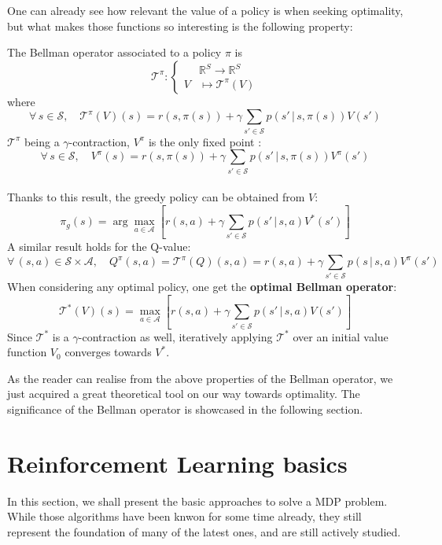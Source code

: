 One can already see how relevant the value of a policy is when seeking optimality, but what makes those functions so interesting is the following property:

\begin{defi}
  The Bellman operator \citep{bellman1957markovian} associated to a policy $\pi$ is $$\mathcal{T}^\pi : \begin{cases} &\mathbb{R}^S \to \mathbb{R}^S\\ V &\mapsto \mathcal{T}^\pi(V) \end{cases}$$ where $$\forall \, s \in \mathcal{S},\quad \mathcal{T}^\pi(V)(s) = r(s, \pi(s)) + \gamma \sum_{s'\in \mathcal{S}} p(s' \,|\, s, \pi(s)) V(s')$$
  $\mathcal{T}^\pi$ being a $\gamma$-contraction, $V^\pi$ is the only fixed point \citep{blackwell1962discrete}: $$\forall \, s \in \mathcal{S},\quad V^\pi(s) = r(s, \pi(s)) + \gamma \sum_{s'\in \mathcal{S}} p(s' \,|\, s, \pi(s)) V^\pi(s')$$\\
  Thanks to this result, the greedy policy can be obtained from $V$: $$\pi_g(s) = \arg\max_{a \in \mathcal{A}} \left[ r(s,a) + \gamma \sum_{s' \in \mathcal{S}}p(s' \,|\, s, a) V^*(s') \right]$$
  A similar result holds for the Q-value: $$\forall \, (s, a) \in \mathcal{S}\times \mathcal{A},\quad Q^\pi(s, a) = \mathcal{T}^\pi(Q)(s,a) = r(s, a) + \gamma \sum_{s' \in \mathcal{S}} p(s \,|\, s,a) V^\pi (s')$$
  When considering any optimal policy, one get the \textbf{optimal Bellman operator}: $$\mathcal{T}^*(V)(s) = \max_{a \in \mathcal{A}} \left[ r(s, a) + \gamma \sum_{s' \in \mathcal{S}} p(s' \,|\, s,a)V(s') \right]$$
  Since $\mathcal{T}^*$ is a $\gamma$-contraction as well, iteratively applying $\mathcal{T}^*$ over an initial value function $V_0$ converges towards $V^*$.
\end{defi}

As the reader can realise from the above properties of the Bellman operator, we just acquired a great theoretical tool on our way towards optimality. The significance of the Bellman operator is showcased in the following section.


\section{Reinforcement Learning basics}
\label{section:RL}

In this section, we shall present the basic approaches to solve a MDP problem. While those algorithms have been knwon for some time already, they still represent the foundation of many of the latest ones, and are still actively studied.

